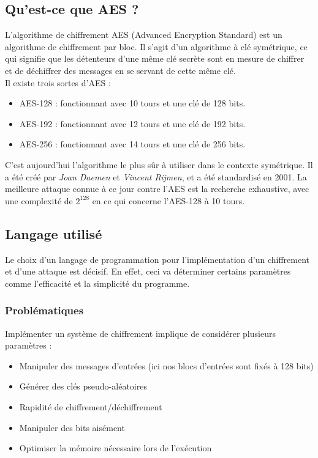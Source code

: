 \subsection{Qu'est-ce que AES ?}


\indent L'algorithme de chiffrement AES (Advanced Encryption Standard) est un algorithme de chiffrement par bloc. Il s'agit d'un algorithme à clé symétrique, ce qui signifie que les détenteurs d'une même clé secrète sont en mesure de chiffrer et de déchiffrer des messages en se servant de cette même clé. \\
Il existe trois sortes d'AES :
\begin{itemize}
    \item AES-128 : fonctionnant avec 10 tours et une clé de 128 bits.
    \item AES-192 : fonctionnant avec 12 tours et une clé de 192 bits.
    \item AES-256 : fonctionnant avec 14 tours et une clé de 256 bits.
\end{itemize}

C'est aujourd'hui l'algorithme le plus sûr à utiliser dans le contexte symétrique. Il a été créé par \textit{Joan Daemen} et \textit{Vincent Rijmen}, et a été standardisé en 2001. La meilleure attaque connue à ce jour contre l'AES est la recherche exhaustive, avec une complexité de $2^{128}$ en ce qui concerne l'AES-128 à 10 tours.

\subsection{Langage utilisé}
Le choix d'un langage de programmation pour l'implémentation d'un chiffrement et d'une attaque est décisif. En effet, ceci va déterminer certains paramètres comme l'efficacité et la simplicité du programme.

\subsubsection{Problématiques}
Implémenter un système de chiffrement implique de considérer plusieurs paramètres : 
\begin{itemize}
	\item Manipuler des messages d'entrées (ici nos blocs d'entrées sont fixés à 128 bits)
	\item Générer des clés pseudo-aléatoires
	\item Rapidité de chiffrement/déchiffrement
	\item Manipuler des bits aisément
	\item Optimiser la mémoire nécessaire lors de l'exécution
\end{itemize} 

